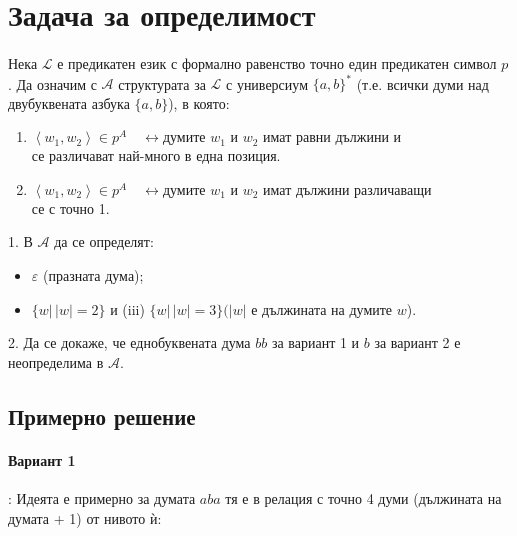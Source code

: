 \documentclass[12pt]{article}
\begin{document}
\newpage
\section{Задача за определимост}
\paragraph{}
Нека $\mathcal{L}$ е предикатен език с формално равенство точно един предикатен символ $p$. Да означим с $\mathcal{A}$ структурата за $\mathcal{L}$ с универсиум $\{a, b\}^{*}$ (т.е. всички думи над двубуквената азбука $\{a, b\}$), в която: 
\begin{enumerate}
    \item $\left\langle w_{1}, w_{2}\right\rangle \in p^{A} \quad \longleftrightarrow  \text{думите } w_{1} \text{ и } w_{2} \text{ имат равни дължини и}$\\ се различават най-много в една позиция.
    \item $\left\langle w_{1}, w_{2}\right\rangle \in p^{A} \quad \longleftrightarrow  \text{думите } w_{1} \text{ и } w_{2} \text{ имат дължини различаващи}$\\ се с точно 1.
\end{enumerate}
1. В $\mathcal{A}$ да се определят:
\begin{itemize}
    \item $\varepsilon$ (празната дума);
    \item $\{w|\,| w |=2\}$ и (iii) $\{w|\,| w |=3\}(|w| \text { е дължината на думите } w$).
\end{itemize}
2. Да се докаже, че еднобуквената дума $bb$ за вариант 1 и $b$ за вариант 2 е неопределима в $\mathcal{A}$.

\subsection{Примерно решение}
\paragraph{\hspace{0.5em} Вариант 1}:
Идеята е примерно за думата $aba$ тя е в релация с точно 4 думи (дължината на думата + 1) от нивото ѝ:

\vskip 0.2in
\begin{addmargin}[1em]{2em}
\begin{center}
\end{center}
\end{addmargin}
\end{document}
